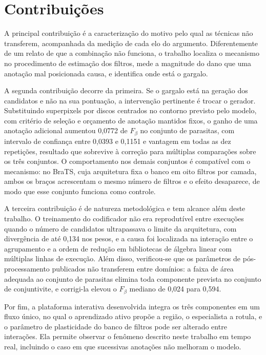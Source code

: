 \section{Contribuições}

A principal contribuição é a caracterização do motivo pelo qual as técnicas não transferem, acompanhada da medição de cada elo do argumento. Diferentemente de um relato de que a combinação não funciona, o trabalho localiza o mecanismo no procedimento de estimação dos filtros, mede a magnitude do dano que uma anotação mal posicionada causa, e identifica onde está o gargalo.

A segunda contribuição decorre da primeira. Se o gargalo está na geração dos candidatos e não na sua pontuação, a intervenção pertinente é trocar o gerador. Substituindo superpixels por discos centrados no contorno previsto pelo modelo, com critério de seleção e orçamento de anotação mantidos fixos, o ganho de uma anotação adicional aumentou 0,0772 de $F_\beta$ no conjunto de parasitas, com intervalo de confiança entre 0,0393 e 0,1151 e vantagem em todas as dez repetições, resultado que sobrevive à correção para múltiplas comparações sobre os três conjuntos. O comportamento nos demais conjuntos é compatível com o mecanismo: no BraTS, cuja arquitetura fixa o banco em oito filtros por camada, ambos os braços acrescentam o mesmo número de filtros e o efeito desaparece, de modo que esse conjunto funciona como controle.

A terceira contribuição é de natureza metodológica e tem alcance além deste trabalho. O treinamento do codificador não era reprodutível entre execuções quando o número de candidatos ultrapassava o limite da arquitetura, com divergência de até 0,134 nos pesos, e a causa foi localizada na interação entre o agrupamento e a ordem de redução em bibliotecas de álgebra linear com múltiplas linhas de execução. Além disso, verificou-se que os parâmetros de pós-processamento publicados não transferem entre domínios: a faixa de área adequada ao conjunto de parasitas elimina toda componente prevista no conjunto de conjuntivite, e corrigi-la elevou o $F_\beta$ mediano de 0,024 para 0,594.

Por fim, a plataforma interativa desenvolvida integra os três componentes em um fluxo único, no qual o aprendizado ativo propõe a região, o especialista a rotula, e o parâmetro de plasticidade do banco de filtros pode ser alterado entre interações. Ela permite observar o fenômeno descrito neste trabalho em tempo real, incluindo o caso em que sucessivas anotações não melhoram o modelo.

